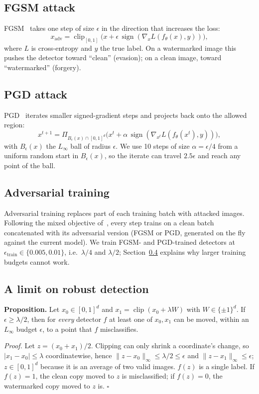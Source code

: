 \documentclass[sigconf, nonacm]{acmart}
\begin{document}
\subsection{FGSM attack}
FGSM~\cite{paper2} takes one step of size $\epsilon$ in the direction that increases the loss:
\[ x_{\text{adv}} = \operatorname{clip}_{[0,1]}\big(x + \epsilon\,\operatorname{sign}(\nabla_x L(f_\theta(x), y))\big), \]
where $L$ is cross-entropy and $y$ the true label. On a watermarked image this pushes the
detector toward ``clean'' (evasion); on a clean image, toward ``watermarked'' (forgery).

\subsection{PGD attack}
PGD~\cite{paper3} iterates smaller signed-gradient steps and projects back onto the allowed region:
\[ x^{t+1} = \Pi_{B_\epsilon(x)\cap[0,1]^d}\big(x^t + \alpha\,\operatorname{sign}(\nabla_{x^t} L(f_\theta(x^t), y))\big), \]
with $B_\epsilon(x)$ the $L_\infty$ ball of radius $\epsilon$. We use 10 steps of size
$\alpha=\epsilon/4$ from a uniform random start in $B_\epsilon(x)$, so the iterate can travel
$2.5\epsilon$ and reach any point of the ball.

\subsection{Adversarial training}
Adversarial training replaces part of each training batch with attacked images. Following the
mixed objective of~\cite{paper2}, every step trains on a clean batch concatenated with its
adversarial version (FGSM or PGD, generated on the fly against the current model). We train FGSM-
and PGD-trained detectors at $\epsilon_{\text{train}} \in \{0.005, 0.01\}$, i.e.\ $\lambda/4$ and
$\lambda/2$; Section~\ref{sec:limit} explains why larger training budgets cannot work.

\subsection{A limit on robust detection}\label{sec:limit}
\textbf{Proposition.} Let $x_0\in[0,1]^d$ and $x_1 = \operatorname{clip}(x_0 + \lambda W)$ with
$W\in\{\pm1\}^d$. If $\epsilon \ge \lambda/2$, then for \emph{every} detector $f$ at least one of
$x_0, x_1$ can be moved, within an $L_\infty$ budget $\epsilon$, to a point that $f$ misclassifies.

\emph{Proof.} Let $z = (x_0 + x_1)/2$. Clipping can only shrink a coordinate's change, so
$|x_1 - x_0| \le \lambda$ coordinatewise, hence $\|z - x_0\|_\infty \le \lambda/2 \le \epsilon$ and
$\|z - x_1\|_\infty \le \epsilon$; $z\in[0,1]^d$ because it is an average of two valid images.
$f(z)$ is a single label. If $f(z)=1$, the clean copy moved to $z$ is misclassified; if $f(z)=0$,
the watermarked copy moved to $z$ is. \hfill$\square$
\end{document}
